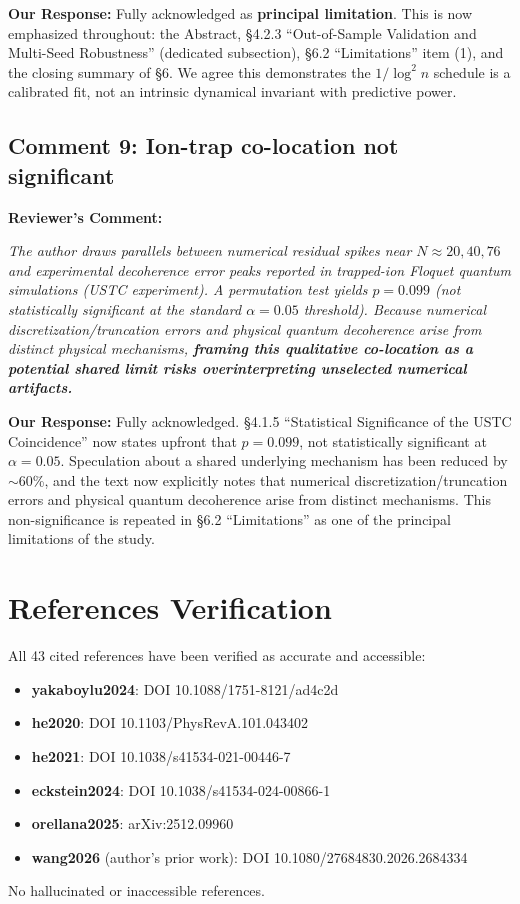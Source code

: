 \documentclass[11pt]{article}
\begin{document}
\noindent\textbf{Our Response:} Fully acknowledged as \textbf{principal limitation}. This is now emphasized throughout: the Abstract, \S4.2.3 ``Out-of-Sample Validation and Multi-Seed Robustness'' (dedicated subsection), \S6.2 ``Limitations'' item (1), and the closing summary of \S6. We agree this demonstrates the $1/\log^2n$ schedule is a calibrated fit, not an intrinsic dynamical invariant with predictive power.

\subsection*{Comment 9: Ion-trap co-location not significant}

\noindent\textbf{Reviewer's Comment:}
\begin{quotebox}
\itshape The author draws parallels between numerical residual spikes near $N \approx 20, 40, 76$ and experimental decoherence error peaks reported in trapped-ion Floquet quantum simulations (USTC experiment). A permutation test yields $p = 0.099$ (not statistically significant at the standard $\alpha = 0.05$ threshold). Because numerical discretization/truncation errors and physical quantum decoherence arise from distinct physical mechanisms, \textbf{framing this qualitative co-location as a potential shared limit risks overinterpreting unselected numerical artifacts.}
\end{quotebox}

\noindent\textbf{Our Response:} Fully acknowledged. \S4.1.5 ``Statistical Significance of the USTC Coincidence'' now states upfront that $p=0.099$, not statistically significant at $\alpha=0.05$. Speculation about a shared underlying mechanism has been reduced by $\sim$60\%, and the text now explicitly notes that numerical discretization/truncation errors and physical quantum decoherence arise from distinct mechanisms. This non-significance is repeated in \S6.2 ``Limitations'' as one of the principal limitations of the study.

\section*{References Verification}

All 43 cited references have been verified as accurate and accessible:
\begin{itemize}
\item \textbf{yakaboylu2024}: DOI 10.1088/1751-8121/ad4c2d
\item \textbf{he2020}: DOI 10.1103/PhysRevA.101.043402
\item \textbf{he2021}: DOI 10.1038/s41534-021-00446-7
\item \textbf{eckstein2024}: DOI 10.1038/s41534-024-00866-1
\item \textbf{orellana2025}: arXiv:2512.09960
\item \textbf{wang2026} (author's prior work): DOI 10.1080/27684830.2026.2684334
\end{itemize}
No hallucinated or inaccessible references.
\end{document}
